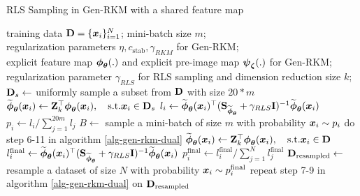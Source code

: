 \begin{algorithm}[H]
\caption{RLS Sampling in Gen-RKM with a shared feature map}
\label{alg-rls-rkm-shared}
\begin{algorithmic}[1]
\Require training data $\mathbf{D} = \{\boldsymbol{x}_i\}_{i=1}^{N}$; mini-batch size $m$; \\
regularization parameters $\eta, c_{\text{stab}}, \gamma_{RKM}$ for Gen-RKM; \\
explicit feature map $\boldsymbol{\phi}_{\boldsymbol{\theta}}(.)$ and explicit pre-image map $\boldsymbol{\psi}_{\boldsymbol{\zeta}}(.)$ for Gen-RKM; \\
regularization parameter $\gamma_{RLS}$ for RLS sampling and dimension reduction size $k$;
        \State $\mathbf{D}_{s} \gets$ uniformly sample a subset from $\mathbf{D}$ with size $20*m$ 
        \State $\widetilde{\boldsymbol{\phi}}_{\boldsymbol{\theta}}(\boldsymbol{x}_i) \gets \mathbf{Z}_k^\top\boldsymbol{\phi}_{\boldsymbol{\theta}}(\boldsymbol{x}_i),\quad \text{s.t.}\boldsymbol{x}_i\in \mathbf{D}_s$ 
        \State $l_i \gets \widetilde{\boldsymbol{\phi}}_{\boldsymbol{\theta}}(\boldsymbol{x}_i)^\top(\mathbf{S}_{\widetilde{\boldsymbol{\phi}}_{\boldsymbol{\theta}}}+\gamma_{RLS}\mathbf{I})^{-1}\widetilde{\boldsymbol{\phi}}_{\boldsymbol{\theta}}(\boldsymbol{x}_i)$
        \State $p_i \gets l_i / \sum_{j=1}^{20m} l_j$
        \State $B \gets$ sample a mini-batch of size $m$ with probability $\boldsymbol{x}_i \sim p_i$
        \State do step 6-11 in algorithm \ref{alg-gen-rkm-dual}
        \EndFor
    \EndFor
{}
\State $\widetilde{\boldsymbol{\phi}}_{\boldsymbol{\theta}}(\boldsymbol{x}_i) \gets \mathbf{Z}_k^\top\boldsymbol{\phi}_{\boldsymbol{\theta}}(\boldsymbol{x}_i),\quad \text{s.t.}\boldsymbol{x}_i\in \mathbf{D}$
\State $l_i^{\text{final}} \gets \widetilde{\boldsymbol{\phi}}_{\boldsymbol{\theta}}(\boldsymbol{x}_i)^\top(\mathbf{S}_{\widetilde{\boldsymbol{\phi}}_{\boldsymbol{\theta}}}+\gamma_{RLS}\mathbf{I})^{-1}\widetilde{\boldsymbol{\phi}}_{\boldsymbol{\theta}}(\boldsymbol{x}_i)$
\State $p_i^{\text{final}} \gets l_i^{\text{final}} / \sum_{j=1}^N l_j^{\text{final}}$
\State $\mathbf{D}_{\text{resampled}} \gets$ resample a dataset of size $N$ with probability $\boldsymbol{x}_i \sim p_i^{\text{final}}$ 
\State repeat step 7-9 in algorithm \ref{alg-gen-rkm-dual}  on $\mathbf{D}_{\text{resampled}}$
\end{algorithmic}
\end{algorithm}